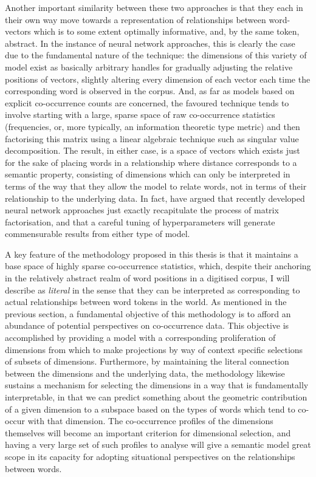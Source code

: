 Another important similarity between these two approaches is that they each in their own way move towards a representation of relationships between word-vectors which is to some extent optimally informative, and, by the same token, abstract.  In the instance of neural network approaches, this is clearly the case due to the fundamental nature of the technique: the dimensions of this variety of model exist as basically arbitrary handles for gradually adjusting the relative positions of vectors, slightly altering every dimension of each vector each time the corresponding word is observed in the corpus.  And, as far as models based on explicit co-occurrence counts are concerned, the favoured technique tends to involve starting with a large, sparse space of raw co-occurrence statistics (frequencies, or, more typically, an information theoretic type metric) and then factorising this matrix using a linear algebraic technique such as singular value decomposition.  The result, in either case, is a space of vectors which exists just for the sake of placing words in a relationship where distance corresponds to a semantic property, consisting of dimensions which can only be interpreted in terms of the way that they allow the model to relate words, not in terms of their relationship to the underlying data.  In fact, \cite{LevyEA2014b} have argued that recently developed neural network approaches just exactly recapitulate the process of matrix factorisation, and that a careful tuning of hyperparameters will generate commensurable results from either type of model.

A key feature of the methodology proposed in this thesis is that it maintains a base space of highly sparse co-occurrence statistics, which, despite their anchoring in the relatively abstract realm of word positions in a digitised corpus, I will describe as \emph{literal} in the sense that they can be interpreted as corresponding to actual relationships between word tokens in the world.  As mentioned in the previous section, a fundamental objective of this methodology is to afford an abundance of potential perspectives on co-occurrence data.  This objective is accomplished by providing a model with a corresponding proliferation of dimensions from which to make projections by way of context specific selections of subsets of dimensions.  Furthermore, by maintaining the literal connection between the dimensions and the underlying data, the methodology likewise sustains a mechanism for selecting the dimensions in a way that is fundamentally interpretable, in that we can predict something about the geometric contribution of a given dimension to a subspace based on the types of words which tend to co-occur with that dimension.  The co-occurrence profiles of the dimensions themselves will become an important criterion for dimensional selection, and having a very large set of such profiles to analyse will give a semantic model great scope in its capacity for adopting situational perspectives on the relationships between words.

